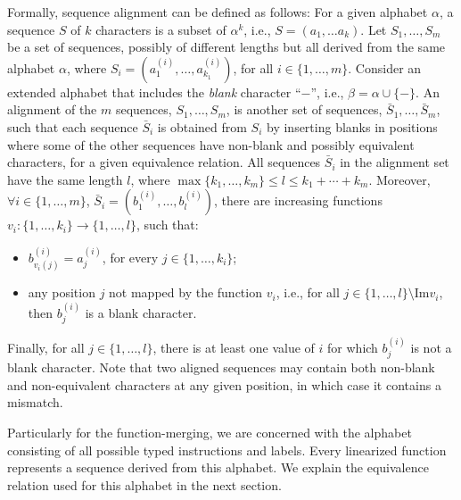 Formally, sequence alignment can be defined as follows:
For a given alphabet $\alpha$, a sequence $S$ of $k$ characters is a subset of
$\alpha^k$, i.e., $S = (a_1, \ldots a_k)$.
Let $S_1, \ldots, S_m$ be a set of sequences, possibly of different lengths but
all derived from the same alphabet $\alpha$, where
$S_i = (a_1^{(i)}, \ldots, a_{k_1}^{(i)})$, for all $i\in\{1,\ldots,m\}$.
Consider an extended alphabet that includes the \textit{blank} character ``$-$'',
i.e., $\beta = \alpha \cup \{-\}$.
An alignment of the $m$ sequences, $S_1, \ldots, S_m$, is another set of sequences,
$\bar{S}_1, \ldots, \bar{S}_m$, such that each sequence $\bar{S}_i$ is obtained
from $S_i$ by inserting blanks in positions where some of the other sequences
have non-blank and possibly equivalent characters, for a given equivalence relation.
All sequences $\bar{S}_i$ in the alignment set have the same length $l$, where
$\max\{k_1,\ldots,k_m\} \leq l \leq k_1 + \cdots + k_m$.
Moreover, $\forall i\in\{1,\ldots, m\}$, $\bar{S}_i = (b_1^{(i)},\ldots,b_l^{(i)})$,
there are increasing functions $v_i: \{1,\ldots,k_i\} \to \{1,\ldots,l\}$, such that:
\begin{itemize} %
\item $b_{v_i(j)}^{(i)} = a_j^{(i)}$, for every $j \in \{1,\ldots,k_i\}$;
\item any position $j$ not mapped by the function $v_i$, i.e.,
for all $j \in \{1,\ldots,l\}\setminus \textrm{Im} v_i$,
then $b_j^{(i)}$ is a blank character.
\end{itemize}
Finally, for all $j\in\{1,\ldots,l\}$, there is at least one value of $i$ for
which $b_j^{(i)}$ is not a blank character.
Note that two aligned sequences may contain both non-blank and non-equivalent
characters at any given position, in which case it contains a mismatch.

Particularly for the function-merging, we are concerned with the alphabet
consisting of all possible typed instructions and labels.
Every linearized function represents a sequence derived from this alphabet.
We explain the equivalence relation used for this alphabet in the next section.

